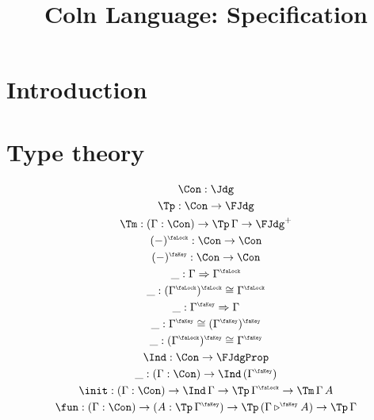 \documentclass[fleqn]{scrartcl}
\title{Coln Language: Specification}
\begin{document}
\maketitle

\section{Introduction}

\section{Type theory}

\begin{gather*}
  \Con : \Jdg \\
  \Tp : \Con \to \FJdg \\
  \Tm : (\Gamma : \Con) \to \Tp\,\Gamma \to \FJdg^+ \\
  (-)^{\lock} : \Con \to \Con \\
  (-)^{\key} : \Con \to \Con \\
  \_ : \Gamma \To \Gamma^{\lock} \\
  \_ : (\Gamma^{\lock})^{\lock} \cong \Gamma^{\lock} \\
  \_ : \Gamma^{\key} \To \Gamma \\
  \_ : \Gamma^{\key} \cong (\Gamma^{\key})^{\key} \\
  \_ : (\Gamma^{\lock})^{\key} \cong \Gamma^{\key} \\
  \Ind : \Con \to \FJdgProp \\
  \_ : (\Gamma : \Con) \to \Ind\,(\Gamma^{\key}) \\
  \init : (\Gamma : \Con) \to \Ind\,\Gamma \to \Tp\,\Gamma^{\lock} \to \Tm\,\Gamma\,A \\
  \fun : (\Gamma : \Con) \to (A : \Tp\,\Gamma^{\key}) \to \Tp\,(\Gamma \tri^{\key} A) \to \Tp\,\Gamma
\end{gather*}
\end{document}
